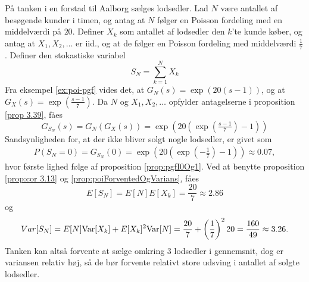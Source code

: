 \begin{exmp}
På tanken i en forstad til Aalborg sælges lodsedler. Lad $N$ være antallet af besøgende kunder i timen, og antag at $N$ følger en Poisson fordeling med en middelværdi på $20$. Definer $X_k$ som antallet af lodsedler den $k$'te kunde køber, og antag at $X_1, X_2, \ldots$ er iid., og at de følger en Poisson fordeling med middelværdi $\frac{1}{7}$. Definer den stokastiske variabel
\begin{equation*}
    S_N = \sum^N_{k = 1} X_k
\end{equation*}
Fra eksempel \ref{ex:poi-pgf} vides det, at $G_N(s) = \exp(20(s - 1))$, og at $G_{X}(s) = \exp\left(\tfrac{s-1}{7}\right)$. Da $N$ og $X_1, X_2, \ldots$ opfylder antagelserne i proposition \ref{prop 3.39}, fåes 
\begin{equation*}
    G_{S_N}(s) = G_N(G_X(s)) = \exp\left(20\left(\exp\left(\tfrac{s - 1}{7}\right) - 1\right)\right)
\end{equation*}
Sandsynligheden for, at der ikke bliver solgt nogle lodsedler, er givet som 
\begin{align*}
    P(S_N=0)= G_{S_N}(0) = \exp\left(20\left(\exp\left(-\tfrac{1}{7}\right) - 1\right)\right) \approx 0.07,
\end{align*}
hvor første lighed følge af proposition \ref{prop:pgfI0Og1}. Ved at benytte proposition \ref{prop:cor 3.13} og \ref{prop:poiForventedOgVarians}, fåes 
\begin{equation*}
    E[S_N] = E[N]E[X_k] = \frac{20}{7} \approx 2.86
\end{equation*}
og 
\begin{equation*}
    Var[S_N] =E[N]\textnormal{Var}[X_k]+E[X_k]^2\textnormal{Var}[N] = \frac{20}{7} + \left(\frac{1}{7}\right)^2 20 =  \frac{160}{49} \approx 3.26.
\end{equation*}
Tanken kan altså forvente at sælge omkring 3 lodsedler i gennemsnit, dog er variansen relativ høj, så de bør forvente relativt store udsving i antallet af solgte lodsedler.
\end{exmp}

